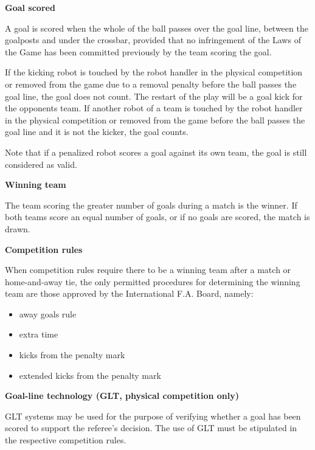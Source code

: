 \clearpage
\sffamily
{\bfseries\color[rgb]{0.4,0.4,0.4}{Law 10 -- The Method of Scoring} }
{}

\bigskip

{\bfseries Goal scored }

\headlinebox

A goal is scored when the whole of the ball passes over the goal line,
between the goalposts and under the crossbar,
provided that no infringement of the Laws of the Game has been committed
previously by the team scoring the goal.

\bigskip

If the kicking robot is touched by the robot handler in the physical competition or removed from the game due to a removal penalty before the ball passes the goal line,
the goal does not count.
The restart of the play will be a goal kick for the opponents team.
If another robot of a team is touched by the robot handler in the physical competition or removed from the game before the ball
passes the goal line and it is not the kicker, the goal counts.

\bigskip

Note that if a penalized robot scores a goal against its own team, the
  goal is still considered as valid.

\bigskip

{\bfseries Winning team}

\headlinebox

The team scoring the greater number of goals during a match is the winner. If both teams score an equal number of goals, or if no goals are scored, the match is drawn. 

\bigskip

{\bfseries Competition rules }

\headlinebox

When competition rules require there to be a winning team after a match or home-and-away tie, the only permitted procedures for determining the winning team are those approved by the International F.A. Board, namely:

\begin{itemize}
\item away goals rule
\item extra time
\item kicks from the penalty mark
\item {}extended kicks from the penalty mark
\end{itemize}


{\bfseries Goal-line technology (GLT, physical competition only) }

\headlinebox

GLT systems may be used for the purpose of verifying whether a goal has been scored to support the referee{\textquoteright}s decision. The use of GLT must be stipulated in the respective competition rules.
